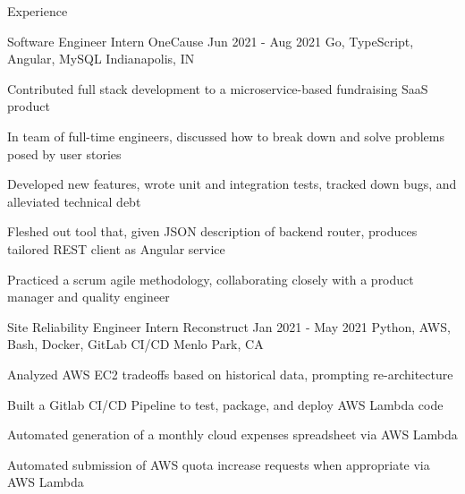\documentclass{resume} %
\begin{document}
\begin{rSection}{ Experience }


\begin{rSubsection}{ Software Engineer Intern \at OneCause }{ Jun 2021 - Aug 2021 }{ Go, TypeScript, Angular, MySQL }{ Indianapolis, IN }
\item Contributed full stack development to a microservice-based fundraising SaaS product
\item In team of full-time engineers, discussed how to break down and solve problems posed by user stories
\item Developed new features, wrote unit and integration tests, tracked down bugs, and alleviated technical debt
\item Fleshed out tool that, given JSON description of backend router, produces tailored REST client as Angular service
\item Practiced a scrum agile methodology, collaborating closely with a product manager and quality engineer
\end{rSubsection}

\begin{rSubsection}{ Site Reliability Engineer Intern \at Reconstruct }{ Jan 2021 - May 2021 }{ Python, AWS, Bash, Docker, GitLab CI/CD }{ Menlo Park, CA }
\item Analyzed AWS EC2 tradeoffs based on historical data, prompting re-architecture
\item Built a Gitlab CI/CD Pipeline to test, package, and deploy AWS Lambda code
\item Automated generation of a monthly cloud expenses spreadsheet via AWS Lambda
\item Automated submission of AWS quota increase requests when appropriate via AWS Lambda
\end{rSubsection}


\end{rSection}
\end{document}
